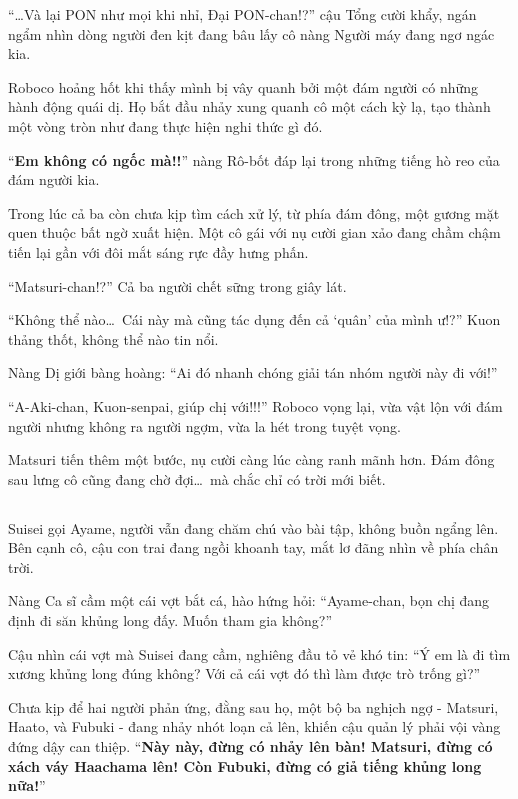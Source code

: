 \documentclass[../main.tex]{subfiles}
\begin{document}
``\dots Và lại PON như mọi khi nhỉ, Đại PON-chan!?'' cậu Tổng cười khẩy, ngán ngẩm nhìn dòng người đen kịt đang bâu lấy cô nàng Người máy đang ngơ ngác kia.

Roboco hoảng hốt khi thấy mình bị vây quanh bởi một đám người có những hành động quái dị. Họ bắt đầu nhảy xung quanh cô một cách kỳ lạ, tạo thành một vòng tròn như đang thực hiện nghi thức gì đó.

``\textbf{Em không có ngốc mà!!}'' nàng Rô-bốt đáp lại trong những tiếng hò reo của đám người kia.

Trong lúc cả ba còn chưa kịp tìm cách xử lý, từ phía đám đông, một gương mặt quen thuộc bất ngờ xuất hiện. Một cô gái với nụ cười gian xảo đang chầm chậm tiến lại gần với đôi mắt sáng rực đầy hưng phấn.


``Matsuri-chan!?'' Cả ba người chết sững trong giây lát.

``Không thể nào\dots\ Cái này mà cũng tác dụng đến cả `quân' của mình ư!?'' Kuon thảng thốt, không thể nào tin nổi.

Nàng Dị giới bàng hoàng: ``Ai đó nhanh chóng giải tán nhóm người này đi với!''

``A-Aki-chan, Kuon-senpai, giúp chị với!!!'' Roboco vọng lại, vừa vật lộn với đám người nhưng không ra người ngợm, vừa la hét trong tuyệt vọng.

Matsuri tiến thêm một bước, nụ cười càng lúc càng ranh mãnh hơn. Đám đông sau lưng cô cũng đang chờ đợi\dots\ mà chắc chỉ có trời mới biết.

\subsection*{\label{ep-S13.VIII}}

Suisei gọi Ayame, người vẫn đang chăm chú vào bài tập, không buồn ngẩng lên. Bên cạnh cô, cậu con trai đang ngồi khoanh tay, mắt lơ đãng nhìn về phía chân trời.

Nàng Ca sĩ cầm một cái vợt bắt cá, hào hứng hỏi: ``Ayame-chan, bọn chị đang định đi săn khủng long đấy. Muốn tham gia không?''


Cậu nhìn cái vợt mà Suisei đang cầm, nghiêng đầu tỏ vẻ khó tin: ``Ý em là đi tìm xương khủng long đúng không? Với cả cái vợt đó thì làm được trò trống gì?''

Chưa kịp để hai người phản ứng, đằng sau họ, một bộ ba nghịch ngợ - Matsuri, Haato, và Fubuki - đang nhảy nhót loạn cả lên, khiến cậu quản lý phải vội vàng đứng dậy can thiệp. ``\textbf{Này này, đừng có nhảy lên bàn! Matsuri, đừng có xách váy Haachama lên! Còn Fubuki, đừng có giả tiếng khủng long nữa!}''
\end{document}
